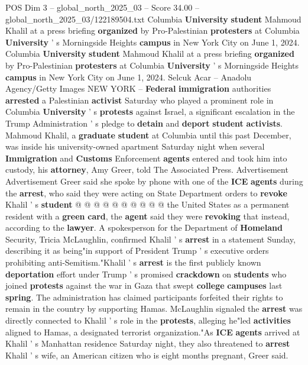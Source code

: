 \begin{textsample}{POS Dim 3 – global\_north\_2025\_03 – Score 34.00 – global\_north\_2025\_03/122189504.txt}  \label{ex:f3_pos_026}
Columbia \textbf{University} \textbf{student} Mahmoud Khalil at a press briefing \textbf{organized} by Pro-Palestinian \textbf{protesters} at Columbia \textbf{University} ' s Morningside Heights \textbf{campus} in New York City on June 1, 2024.
Columbia \textbf{University} \textbf{student} Mahmoud Khalil at a press briefing \textbf{organized} by Pro-Palestinian \textbf{protesters} at Columbia \textbf{University} ' s Morningside Heights \textbf{campus} in New York City on June 1, 2024.
Selcuk Acar -- Anadolu Agency/Getty Images NEW YORK -- \textbf{Federal} \textbf{immigration} authorities \textbf{arrested} a Palestinian \textbf{activist} Saturday who played a prominent role in Columbia \textbf{University} ' s \textbf{protests} against Israel, a significant escalation in the Trump Administration ' s pledge to \textbf{detain} and \textbf{deport} \textbf{student} \textbf{activists}.
Mahmoud Khalil, a \textbf{graduate} \textbf{student} at Columbia until this past December, was inside his university-owned apartment Saturday night when several \textbf{Immigration} and \textbf{Customs} Enforcement \textbf{agents} entered and took him into custody, his \textbf{attorney}, Amy Greer, told The Associated Press.
Advertisement Advertisement Greer said she spoke by phone with one of the \textbf{ICE} \textbf{agents} during the \textbf{arrest}, who said they were acting on State Department orders to \textbf{revoke} Khalil ' s \textbf{student} @ @ @ @ @ @ @ @ @ @ the United States as a permanent resident with a \textbf{green} \textbf{card}, the \textbf{agent} said they were \textbf{revoking} that instead, according to the \textbf{lawyer}.
A spokesperson for the Department of \textbf{Homeland} Security, Tricia McLaughlin, confirmed Khalil ' s \textbf{arrest} in a statement Sunday, describing it as being"in support of President Trump ' s executive orders prohibiting anti-Semitism."Khalil ' s \textbf{arrest} is the first publicly known \textbf{deportation} effort under Trump ' s promised \textbf{crackdown} on \textbf{students} who joined \textbf{protests} against the war in Gaza that swept \textbf{college} \textbf{campuses} last \textbf{spring}.
The administration has claimed participants forfeited their rights to remain in the country by supporting Hamas.
McLaughlin signaled the \textbf{arrest} was directly connected to Khalil ' s role in the \textbf{protests}, alleging he"led \textbf{activities} aligned to Hamas, a designated terrorist organization."As \textbf{ICE} \textbf{agents} arrived at Khalil ' s Manhattan residence Saturday night, they also threatened to \textbf{arrest} Khalil ' s wife, an American citizen who is eight months pregnant, Greer said.

\end{textsample}
